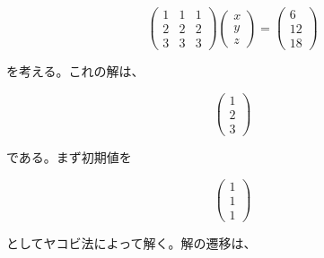 \documentclass{jsarticle}
\begin{document}
        \begin{equation*}
            \left(
                \begin{array}{ccc}
                    1 & 1 & 1 \\
                    2 & 2 & 2 \\
                    3 & 3 & 3
                \end{array}
            \right)\left(
                \begin{array}{c}
                    x \\
                    y \\
                    z
                \end{array}
            \right) = \left(
                \begin{array}{c}
                    6 \\
                    12 \\
                    18
                \end{array}
            \right)
        \end{equation*}

        を考える。これの解は、

        \begin{equation*}
            \left(
                \begin{array}{c}
                    1 \\
                    2 \\
                    3
                \end{array}
            \right)
        \end{equation*}

        である。まず初期値を

        \begin{equation*}
            \left(
                \begin{array}{c}
                    1 \\
                    1 \\
                    1
                \end{array}
            \right)
        \end{equation*}

        としてヤコビ法によって解く。解の遷移は、
\end{document}
